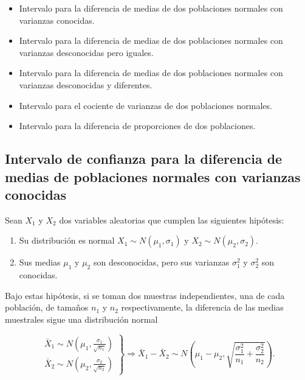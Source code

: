 \documentclass[
  a4paper,
]{scrreport}
\providecommand{\tightlist}{%
  \setlength{\itemsep}{0pt}\setlength{\parskip}{0pt}}\usepackage{longtable,booktabs,array}
\theoremstyle{plain}
\theoremstyle{definition}
\theoremstyle{definition}
\theoremstyle{remark}
\begin{document}
\begin{itemize}
\tightlist
\item
  Intervalo para la diferencia de medias de dos poblaciones normales con
  varianzas conocidas.
\item
  Intervalo para la diferencia de medias de dos poblaciones normales con
  varianzas desconocidas pero iguales.
\item
  Intervalo para la diferencia de medias de dos poblaciones normales con
  varianzas desconocidas y diferentes.
\item
  Intervalo para el cociente de varianzas de dos poblaciones normales.
\item
  Intervalo para la diferencia de proporciones de dos poblaciones.
\end{itemize}

\subsection{Intervalo de confianza para la diferencia de medias de
poblaciones normales con varianzas
conocidas}\label{intervalo-de-confianza-para-la-diferencia-de-medias-de-poblaciones-normales-con-varianzas-conocidas}

Sean \(X_1\) y \(X_2\) dos variables aleatorias que cumplen las
siguientes hipótesis:

\begin{enumerate}
\def\labelenumi{\arabic{enumi}.}
\tightlist
\item
  Su distribución es normal \(X_1\sim N(\mu_1,\sigma_1)\) y
  \(X_2\sim N(\mu_2,\sigma_2)\).
\item
  Sus medias \(\mu_1\) y \(\mu_2\) son desconocidas, pero sus varianzas
  \(\sigma^2_1\) y \(\sigma^2_2\) son conocidas.
\end{enumerate}

Bajo estas hipótesis, si se toman dos muestras independientes, una de
cada población, de tamaños \(n_1\) y \(n_2\) respectivamente, la
diferencia de las medias muestrales sigue una distribución normal

\[
\left.
\begin{array}{l}
\bar{X}_1\sim N\left(\mu_1,\frac{\sigma_1}{\sqrt{n_1}} \right)\\
\bar{X}_2\sim N\left(\mu_2,\frac{\sigma_2}{\sqrt{n_2}} \right)
\end{array}
\right\}
\Rightarrow
\bar{X}_1-\bar{X}_2 \sim N\left(\mu_1-\mu_2,\sqrt{\frac{\sigma^2_1}{n_1}+\frac{\sigma^2_2}{n_2}}\right).
\]
\end{document}
